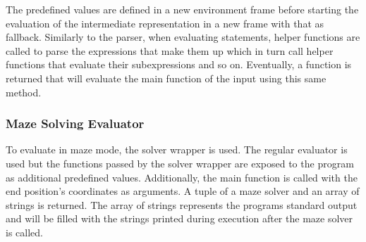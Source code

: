 The predefined values are defined in a new environment frame before starting the evaluation of the intermediate representation in a new frame with that as fallback. Similarly to the parser, when evaluating statements, helper functions are called to parse the expressions that make them up which in turn call helper functions that evaluate their subexpressions and so on. Eventually, a function is returned that will evaluate the main function of the input using this same method.

\subsubsection{Maze Solving Evaluator}

To evaluate in maze mode, the solver wrapper is used. The regular evaluator is used but the functions passed by the solver wrapper are exposed to the program as additional predefined values. Additionally, the main function is called with the end position's coordinates as arguments. A tuple of a maze solver and an array of strings is returned. The array of strings represents the programs standard output and will be filled with the strings printed during execution after the maze solver is called.
